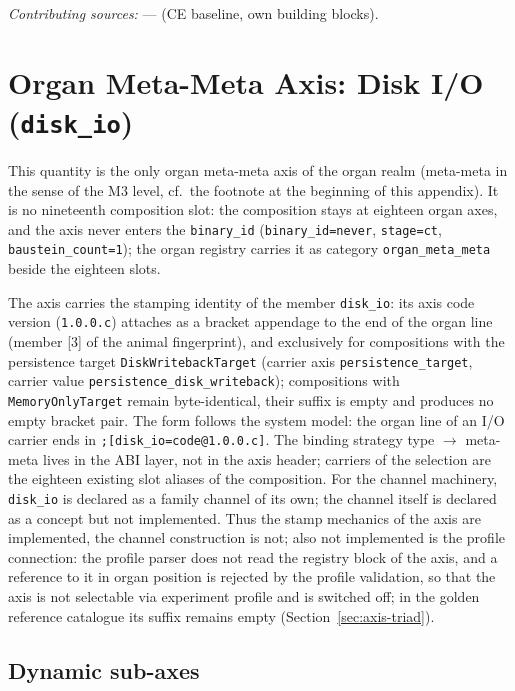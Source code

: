 \emph{Contributing sources:} --- (CE baseline, own building blocks).

\section{Organ Meta-Meta Axis: Disk I/O (\texttt{disk\_io})}\label{sec:app-blocks-disk-io}

This quantity is the only organ meta-meta axis of the organ realm (meta-meta in the sense of the M3 level, cf.\ the footnote at the beginning of this appendix). It is no nineteenth composition slot: the composition stays at eighteen organ axes, and the axis never enters the \texttt{binary\_\allowbreak{}id} (\texttt{binary\_\allowbreak{}id=never}, \texttt{stage=ct}, \texttt{baustein\_\allowbreak{}count=1}); the organ registry carries it as category \texttt{organ\_\allowbreak{}meta\_\allowbreak{}meta} beside the eighteen slots.

The axis carries the stamping identity of the member \texttt{disk\_\allowbreak{}io}: its axis code version (\texttt{1.0.0.c}) attaches as a bracket appendage to the end of the organ line (member [3] of the animal fingerprint), and exclusively for compositions with the persistence target \texttt{Disk\allowbreak{}Writeback\allowbreak{}Target} (carrier axis \texttt{persistence\_\allowbreak{}target}, carrier value \texttt{persistence\_\allowbreak{}disk\_\allowbreak{}writeback}); compositions with \texttt{Memory\allowbreak{}Only\allowbreak{}Target} remain byte-identical, their suffix is empty and produces no empty bracket pair. The form follows the system model: the organ line of an I/O carrier ends in \texttt{;[disk\_\allowbreak{}io=code@1.0.0.c]}. The binding strategy type $\rightarrow$ meta-meta lives in the ABI layer, not in the axis header; carriers of the selection are the eighteen existing slot aliases of the composition. For the channel machinery, \texttt{disk\_\allowbreak{}io} is declared as a family channel of its own; the channel itself is declared as a concept but not implemented.
Thus the stamp mechanics of the axis are implemented, the channel construction is not; also not implemented is the profile connection: the profile parser does not read the registry block of the axis, and a reference to it in organ position is rejected by the profile validation, so that the axis is not selectable via experiment profile and is switched off; in the golden reference catalogue its suffix remains empty (Section~\ref{sec:axis-triad}).

\subsection*{Dynamic sub-axes}

